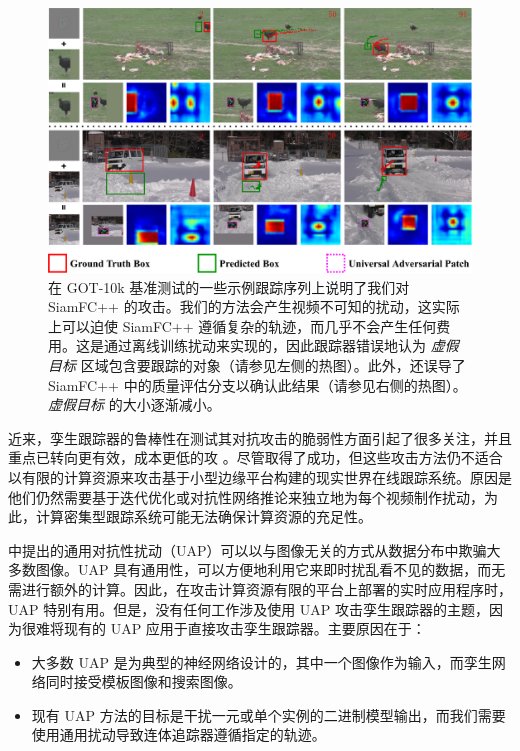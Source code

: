 \begin{figure}[htbp]
\centering
\includegraphics[width=1.0\textwidth]{Img/attack/1_v8.pdf}
\caption{在 GOT-10k 基准测试的一些示例跟踪序列上说明了我们对 SiamFC++ 的攻击。我们的方法会产生视频不可知的扰动，这实际上可以迫使 SiamFC++ 遵循复杂的轨迹，而几乎不会产生任何费用。这是通过离线训练扰动来实现的，因此跟踪器错误地认为 \textit{虚假目标} 区域包含要跟踪的对象（请参见左侧的热图）。此外，还误导了 SiamFC++ 中的质量评估分支以确认此结果（请参见右侧的热图）。\textit{虚假目标} 的大小逐渐减小。} 
\label{fig:1}
\end{figure}

近来，孪生跟踪器的鲁棒性在测试其对抗攻击的脆弱性方面引起了很多关注，并且重点已转向更有效，成本更低的攻 \cite{TTP,FAN,SPARK}。尽管取得了成功，但这些攻击方法仍不适合以有限的计算资源来攻击基于小型边缘平台构建的现实世界在线跟踪系统。原因是他们仍然需要基于迭代优化或对抗性网络推论来独立地为每个视频制作扰动，为此，计算密集型跟踪系统可能无法确保计算资源的充足性。

\cite{UAP} 中提出的通用对抗性扰动（UAP）可以以与图像无关的方式从数据分布中欺骗大多数图像。UAP 具有通用性，可以方便地利用它来即时扰乱看不见的数据，而无需进行额外的计算。因此，在攻击计算资源有限的平台上部署的实时应用程序时，UAP 特别有用。但是，没有任何工作涉及使用 UAP 攻击孪生跟踪器的主题，因为很难将现有的 UAP 应用于直接攻击孪生跟踪器。主要原因在于：
\begin{itemize}
\item 大多数 UAP 是为典型的神经网络设计的，其中一个图像作为输入，而孪生网络同时接受模板图像和搜索图像。
\item 现有 UAP 方法的目标是干扰一元或单个实例的二进制模型输出，而我们需要使用通用扰动导致连体追踪器遵循指定的轨迹。
\end{itemize}

